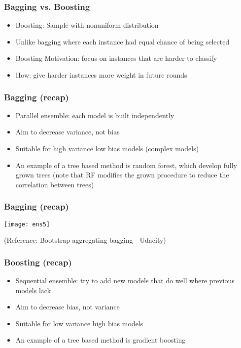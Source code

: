 \begin{frame}[fragile]\frametitle{Bagging vs. Boosting}
\begin{itemize}
\item Boosting: Sample with nonuniform distribution
\item Unlike bagging where each instance had equal chance of being selected
\item Boosting Motivation: focus on instances that are harder to classify
\item How: give harder instances more weight in future rounds
\end{itemize}
\end{frame}

\begin{frame}[fragile]\frametitle{Bagging (recap)}
\begin{itemize}
\item Parallel ensemble: each model is built independently
\item Aim to decrease variance, not bias
\item Suitable for high variance low bias models (complex models)
\item An example of a tree based method is random forest, which develop fully grown trees (note that RF modifies the grown procedure to reduce the correlation between trees)
\end{itemize}

\end{frame}

\begin{frame}[fragile]\frametitle{Bagging (recap)}

\begin{center}
\texttt{[image: ens5]}
\end{center}
\tiny{(Reference: Bootstrap aggregating bagging - Udacity)}
\end{frame}

\begin{frame}[fragile]\frametitle{Boosting (recap)}
\begin{itemize}
\item Sequential ensemble: try to add new models that do well where previous models lack
\item Aim to decrease bias, not variance
\item Suitable for low variance high bias models
\item An example of a tree based method is gradient boosting
\end{itemize}

\end{frame}


